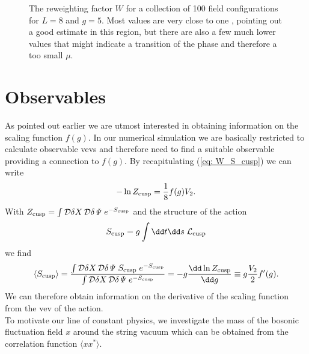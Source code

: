 %
%
\begin{figure}
\centering

\caption{The reweighting factor $W$ for a collection of 100 field configurations for $L=8$ and $g=5$. Most values are very close to one , pointing out a good estimate in this region, but there are also a few much lower values that might indicate a transition of the  phase and therefore a too small $\mu$. \label{fig: rew_factor}}
\end{figure}
%
%
%
%
%
%
%
%
%
%
%
\section{Observables}
As pointed out earlier we are utmost interested in obtaining information on the scaling function $f(g)$. In our numerical simulation we are basically restricted to calculate observable vevs and therefore need to find a suitable observable providing a connection to $f(g)$. By recapitulating (\ref{eq: W_S_cusp}) we can write
%
%
\begin{equation}
-\ln Z_{\rm cusp} = \frac{1}{8} f(g)V_{2}.
\end{equation}
%
%
With $Z_{\rm cusp} = \int \mathcal{D}\delta X\,\mathcal{D}\delta \mathit{\Psi}\;e^{-S_{\rm cusp}}$ and the structure of the action 
\begin{equation}
S_{\rm cusp} = g \int \dd t \dd s \; \mathcal{L}_{\rm cusp}
\end{equation}
we find
%
%
\begin{equation}
\langle S_{\rm cusp} \rangle = \frac{\int \mathcal{D}\delta X\,\mathcal{D}\delta\mathit{\Psi} \; S_{\rm cusp} \;e^{-S_{\rm cusp}}}{\int \mathcal{D}\delta X\,\mathcal{D}\delta\mathit{\Psi} \; e^{-S_{\rm cusp}}} = -g \frac{\dd \ln Z_{\rm cusp}}{\dd g} \equiv g\frac{V_{2}}{2} f'(g).
\label{eq: <S_cusp>}
\end{equation}
%
%
We can therefore obtain information on the derivative of the scaling function from the vev of the action.\\
To motivate our line of constant physics, we investigate the mass of the bosonic fluctuation field $x$ around the string vacuum which can be obtained from the correlation function $\langle x x^{*}\rangle$.
%
%
%
%
%
%
%
% 

